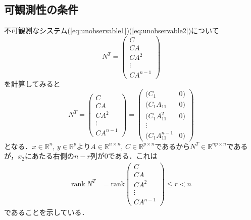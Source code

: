 \subsection{可観測性の条件}

不可観測なシステム(\ref{eq:unobservable1})(\ref{eq:unobservable2})について
\begin{equation}
 N^T =
  \left(\begin{array}{c}
         C        \\
	 C A      \\
	 C A^2    \\
	 \vdots   \\
	 C A^{n-1}
	\end{array}\right)
\end{equation}
を計算してみると
\begin{equation}
 N^T =
  \left(\begin{array}{c}
         C        \\
	 C A      \\
	 C A^2    \\
	 \vdots   \\
	 C A^{n-1}
	\end{array}\right)
 =
  \left(\begin{array}{lr}
	     (C_1           & 0) \\
		 (C_1 A_{11}       & 0) \\
		 (C_1 A_{11}^2     & 0) \\
		 \vdots   \\
		 (C_1 A_{11}^{n-1} & 0)
  \end{array}\right)
\end{equation}
となる．$x \in {\mathbb R}^n$, $ y \in {\mathbb R}^p $より$A\in {\mathbb R}^{n \times n}$, $C \in {\mathbb R}^{p \times n}$であるから$N^T \in {\mathbb R}^{np \times n}$であるが，$x_2$にあたる右側の$n-r$列が$0$である．これは
\begin{align}
 \mbox{rank}\ N^T 
 &= \mbox{rank} 
  \left(\begin{array}{c}
         C        \\
	 C A      \\
	 C A^2    \\
	 \vdots   \\
	 C A^{n-1}
	\end{array}\right)
   \leq r < n
\end{align}
であることを示している．

